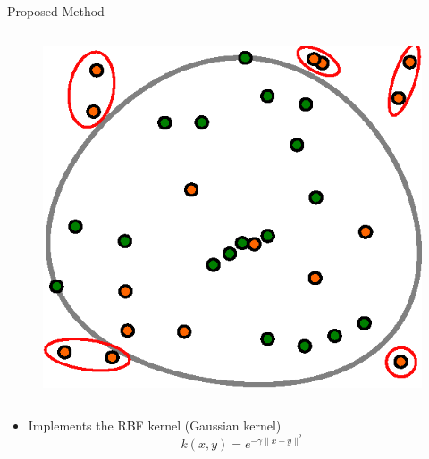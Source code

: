 \begin{frame}{Proposed Method}
\begin{columns}
\begin{itemize}
\begin{figure}
            \includegraphics[scale=.5]{figures/svm_classifier.eps}
        \end{figure}
    \end{itemize}
    \end{columns}
    \vspace{5pt}
    \begin{itemize}
        \item Implements the RBF kernel (Gaussian kernel)
        \begin{equation*}
        k \left(x,y\right)=e^{-\gamma\lVert{x-y}\rVert^2}
        \end{equation*}
    \end{itemize}
\end{frame}

